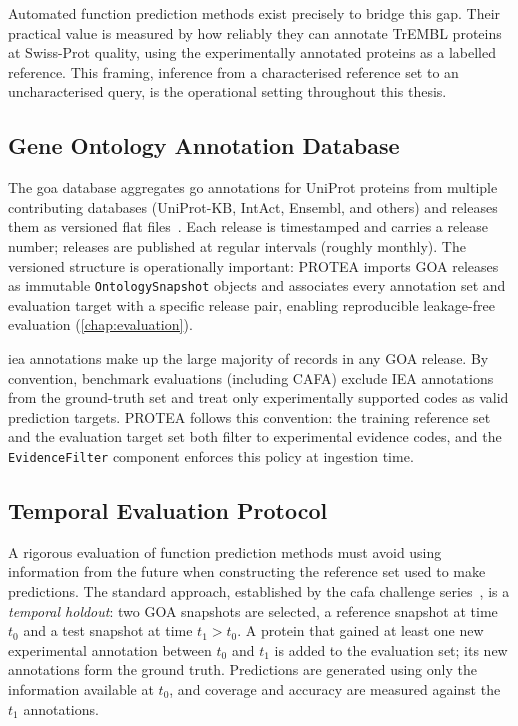 Automated function prediction methods exist precisely to bridge this gap. Their
practical value is measured by how reliably they can annotate TrEMBL proteins
at Swiss-Prot quality, using the experimentally annotated proteins as a labelled
reference. This framing, inference from a characterised reference set to an
uncharacterised query, is the operational setting throughout this thesis.

\subsection{Gene Ontology Annotation Database}
\label{subsec:goa}

The \gls{goa} database aggregates \gls{go} annotations for UniProt proteins from
multiple contributing databases (UniProt-KB, IntAct, Ensembl, and others) and
releases them as versioned flat files~\cite{goconsortium2023}. Each release is
timestamped and carries a release number; releases are published at regular intervals
(roughly monthly). The versioned structure is operationally important: PROTEA
imports GOA releases as immutable \texttt{OntologySnapshot} objects and associates
every annotation set and evaluation target with a specific release pair, enabling
reproducible leakage-free evaluation (\cref{chap:evaluation}).

\gls{iea} annotations make up the large majority of records in any GOA release. By
convention, benchmark evaluations (including CAFA) exclude IEA annotations from
the ground-truth set and treat only experimentally supported codes as valid
prediction targets. PROTEA follows this convention: the training reference set
and the evaluation target set both filter to experimental evidence codes, and the
\texttt{EvidenceFilter} component enforces this policy at ingestion time.

\subsection{Temporal Evaluation Protocol}
\label{subsec:temporal-protocol}

A rigorous evaluation of function prediction methods must avoid using
information from the future when constructing the reference set used to make
predictions. The standard approach, established by the \gls{cafa} challenge
series~\cite{radivojac2013cafa1}, is a \textit{temporal holdout}: two GOA
snapshots are selected, a reference snapshot at time $t_0$ and a test snapshot
at time $t_1 > t_0$. A protein that gained at least one new experimental
annotation between $t_0$ and $t_1$ is added to the evaluation set; its new
annotations form the ground truth. Predictions are generated using only the
information available at $t_0$, and coverage and accuracy are measured against
the $t_1$ annotations.


